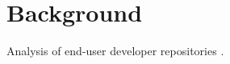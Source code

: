\section{Background}

Analysis of end-user developer repositories
\cite{athreya2012:touchdevelop,bogart2008:coscripter,sihan2013:touchdevelop,stolee2013:yahoopipes}.